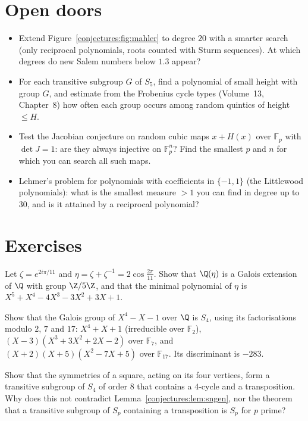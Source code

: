 \section{Open doors}

\begin{itemize}
\item Extend Figure~\ref{conjectures:fig:mahler} to degree $20$ with a smarter search (only reciprocal polynomials, roots counted with Sturm sequences). At which degrees
do new Salem numbers below $1.3$ appear?
\item For each transitive subgroup $G$ of $S_5$, find a polynomial of small height with group $G$, and estimate from the Frobenius cycle types (Volume~13,
Chapter~8) how often each group occurs among random quintics of height $\le H$.
\item Test the Jacobian conjecture on random cubic maps $x+H(x)$ over $\mathbb F_p$ with $\det J=1$: are they always injective on $\mathbb F_p^n$? Find the
smallest $p$ and $n$ for which you can search all such maps.
\item Lehmer's problem for polynomials with coefficients in $\{-1,1\}$ (the Littlewood polynomials): what is the smallest measure $>1$ you can find in
degree up to $30$, and is it attained by a reciprocal polynomial?
\end{itemize}

\section{Exercises}

\begin{exercise}[$\star\star$]\label{conjectures:ex:period}
Let $\zeta=e^{2i\pi/11}$ and $\eta=\zeta+\zeta^{-1}=2\cos\frac{2\pi}{11}$. Show that $\Q(\eta)$ is a Galois extension of $\Q$ with group $\Z/5\Z$, and that
the minimal polynomial of $\eta$ is $X^5+X^4-4X^3-3X^2+3X+1$.
\end{exercise}

\begin{exercise}[$\star\star$]\label{conjectures:ex:x4}
Show that the Galois group of $X^4-X-1$ over $\Q$ is $S_4$, using its factorisations modulo $2$, $7$ and $17$:
$X^4+X+1$ (irreducible over $\mathbb F_2$), $(X-3)(X^3+3X^2+2X-2)$ over $\mathbb F_7$, and $(X+2)(X+5)(X^2-7X+5)$ over $\mathbb F_{17}$. Its discriminant
is $-283$.
\end{exercise}

\begin{exercise}[$\star\star$]\label{conjectures:ex:dihedral}
Show that the symmetries of a square, acting on its four vertices, form a transitive subgroup of $S_4$ of order $8$ that contains a $4$-cycle and a
transposition. Why does this not contradict Lemma~\ref{conjectures:lem:sngen}, nor the theorem that a transitive subgroup of $S_p$ containing a transposition is $S_p$
for $p$ prime?
\end{exercise}

